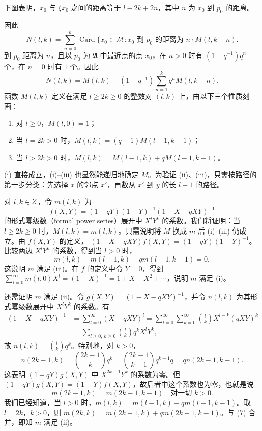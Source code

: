 下图表明，$x_0$ 与 $\xi x_0$ 之间的距离等于 $l-2k+2n$，其中 $n$ 为 $x_0$ 到 $p_0$ 的距离。
\begin{center}
\end{center}
因此
\[
N(l,k)=\sum_{n=0}^k\operatorname{Card}\{x_0\in\mathcal M:\text{$x_0$ 到 $p_0$ 的距离为 $n$}\}\,M(l,k-n).
\]
到 $p_0$ 距离为 $n$，且以 $p_0$ 为 $\mathfrak A$ 中最近点的点 $x_0$，在 $n>0$ 时有 $(1-q^{-1})q^n$ 个，在 $n=0$ 时有 $1$ 个。因此
\[
N(l,k)=M(l,k)+(1-q^{-1})\sum_{n=1}^kq^nM(l,k-n).
\]
函数 $M(l,k)$ 定义在满足 $l\ge2k\ge0$ 的整数对 $(l,k)$ 上，由以下三个性质刻画：
\begin{enumerate}
\item[(i)] 对 $l\ge0$，$M(l,0)=1$；
\item[(ii)] 当 $l=2k>0$ 时，$M(l,k)=(q+1)M(l-1,k-1)$；
\item[(iii)] 当 $l>2k>0$ 时，$M(l,k)=M(l-1,k)+qM(l-1,k-1)$。
\end{enumerate}
(i) 直接成立，(i)--(iii) 也显然能递归地确定 $M$。为验证 (ii)、(iii)，只需按路径的第一步分类：先选择 $x$ 的邻点 $x'$，再数从 $x'$ 到 $y$ 的长 $l-1$ 的路径。

对 $l,k\in Z$，令 $m(l,k)$ 为
\[
f(X,Y)=(1-qY)(1-Y)^{-1}(1-X-qXY)^{-1}
\]
的形式幂级数（formal power series）展开中 $X^lY^k$ 的系数。我们将证明：当 $l\ge2k\ge0$ 时，$M(l,k)=m(l,k)$。只需说明将 $M$ 换成 $m$ 后 (i)--(iii) 仍成立。由 $f(X,Y)$ 的定义，
$(1-X-qXY)f(X,Y)=(1-qY)(1-Y)^{-1}$。比较两边 $X^lY^k$ 的系数，得到当 $l>0$ 时，
\[
m(l,k)-m(l-1,k)-qm(l-1,k-1)=0,
\]
这说明 $m$ 满足 (iii)。在 $f$ 的定义中令 $Y=0$，得到
$\sum_{l=0}^\infty m(l,0)X^l=(1-X)^{-1}=1+X+X^2+\cdots$，说明 $m$ 满足 (i)。

还需证明 $m$ 满足 (ii)。令 $g(X,Y)=(1-X-qXY)^{-1}$，并令 $n(l,k)$ 为其形式幂级数展开中 $X^lY^k$ 的系数。有
\begin{align*}
(1-X-qXY)^{-1}
&=\sum_{l=0}^\infty(X+qXY)^l
=\sum_{l=0}^\infty\sum_{k=0}^\infty\binom lkX^{l-k}(qXY)^k\\
&=\sum_{l\ge0,\,k\ge0}\binom lkq^kX^lY^k,
\end{align*}
故 $n(l,k)=\binom lkq^k$。特别地，对 $k>0$，
\[
n(2k-1,k)=\binom{2k-1}{k}q^k
=\binom{2k-1}{k-1}q^{k-1}q=qn(2k-1,k-1).
\]
这表明 $(1-qY)g(X,Y)$ 中 $X^{2k-1}Y^k$ 的系数为零。但
$(1-qY)g(X,Y)=(1-Y)f(X,Y)$，故后者中这个系数也为零，也就是说
\begin{equation}
m(2k-1,k)=m(2k-1,k-1)\quad\text{对一切 }k>0.\tag{7}
\end{equation}
我们已经知道，当 $l>0$ 时，$m(l,k)=m(l-1,k)+qm(l-1,k-1)$。取 $l=2k$，$k>0$，则
$m(2k,k)=m(2k-1,k)+qm(2k-1,k-1)$。与 (7) 合并，即知 $m$ 满足 (ii)。


